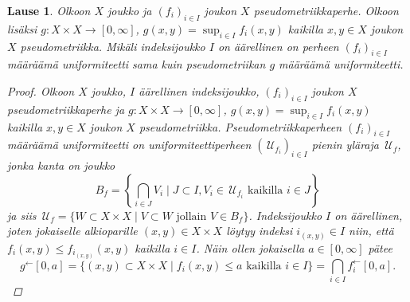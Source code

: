 \documentclass[12pt,a4paper,leqno]{report}
\newcommand{\U}{\,\mathcal{U}}
\newcommand{\Pot}{\mathcal{P}}
\theoremstyle{plain}
\newtheorem{lause}[equation]{Lause}
\theoremstyle{definition}
\theoremstyle{remark}
\begin{document}
\begin{lause}
%
%
Olkoon $X$ joukko ja 
$(f_i)_{i\in I} $ joukon $X$ pseudometriikkaperhe. 
Olkoon lisäksi $g\colon X\times X\rightarrow [0,\infty]$, 
$g(x,y)=\sup_{i\in I} f_i(x,y)$ kaikilla $x,y\in X$ 
joukon $X$ pseudometriikka. 
Mikäli indeksijoukko $I$ on äärellinen on perheen $(f_i)_{i\in I}$ määräämä 
uniformiteetti sama kuin pseudometriikan $g$ määräämä uniformiteetti.
\begin{proof}
Olkoon $X$ joukko, $I$ äärellinen indeksijoukko, 
$(f_i)_{i\in I} $ joukon $X$ pseudometriikkaperhe ja 
$g\colon X\times X\rightarrow [0,\infty]$, 
$g(x,y)=\sup_{i\in I} f_i(x,y)$ kaikilla $x,y\in X$ 
joukon $X$ pseudometriikka. 
Pseudometriikkaperheen $(f_i)_{i\in I} $ määräämä uniformiteetti on 
uniformiteettiperheen $(\U_{f_i})_{i\in I} $ pienin yläraja $\U_f$, 
jonka kanta on joukko 
$$B_f=\left\{\bigcap_{i\in J}V_i\mid J\subset I, V_i\in \U_{f_i} \text{ kaikilla }i\in J\right\}$$
ja siis 
$\U_f=\{W\subset X\times X\mid V\subset W\text{ jollain }V\in B_f\}$.
%
Indeksijoukko $I$ on äärellinen, 
joten jokaiselle alkioparille $(x,y)\in X\times X$ löytyy indeksi $i_{(x,y)}\in I$ niin, 
että $f_i(x,y)\leq f_{i_{(x,y)}}(x,y)$ kaikilla $i\in I$.
Näin ollen jokaisella $a\in [0,\infty]$ pätee  
$$g^\leftarrow[0,a]=\{(x,y)\subset X\times X\mid 
f_i(x,y)\leq a \text{ kaikilla } i\in I
\}=\bigcap_{i\in I} f_i^\leftarrow[0,a].$$

\end{proof}
\end{lause}
\end{document}
